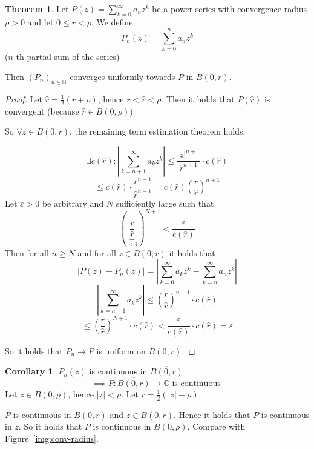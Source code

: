 \documentclass[a4paper,landscape,twocolumn]{article}
\theoremstyle{definition}
\newtheorem{theorem}{Theorem}
\newtheorem{cor}{Corollary}
\newcommand\abs[1]{\left|#1\right|}
\begin{document}
\begin{theorem}
  Let $P(z) = \sum_{k=0}^\infty a_n z^k$ be a power series with convergence radius
  $\rho > 0$ and let $0 \leq r < \rho$. We define
  \[ P_n(z) = \sum_{k=0}^n a_n z^k \]
  ($n$-th partial sum of the series)

  Then $(P_n)_{n\in\mathbb N}$ converges uniformly towards $P$ in $B(0,r)$.
\end{theorem}
\begin{proof}
  Let $\hat{r} = \frac12 (r + \rho)$, hence $r < \hat{r} < \rho$.
  Then it holds that $P(\hat{r})$ is convergent (because $\hat{r} \in B(0,\rho)$)

  So $\forall z \in B(0, r)$, the remaining term estimation theorem holds.

  \[
    \exists c(\hat{r}):
    \abs{\sum_{k=n+1}^\infty a_k z^k} \leq \frac{\abs{z}^{n+1}}{\hat{r}^{n+1}} \cdot c(\hat{r})
  \] \[
    \leq c(\hat{r}) \cdot \frac{r^{n+1}}{\hat{r}^{n+1}} = c(\hat{r}) \left(\frac{r}{\hat{r}}\right)^{n+1}
  \]
  Let $\varepsilon > 0$ be arbitrary and $N$ sufficiently large such that
  \[ \left(\underbrace{\frac{r}{\hat r}}_{<1}\right)^{N+1} < \frac{\varepsilon}{c(\hat r)} \]
  Then for all $n \geq N$ and for all $z \in B(0, r)$ it holds that
  \[ \abs{P(z) - P_n(z)} = \abs{\sum_{k=0}^\infty a_k z^k - \sum_{k=n}^\infty a_n z^k} \]
  \[ \abs{\sum_{k=n+1}^\infty a_k z^k} \leq \left(\frac{r}{\hat r}\right)^{n+1} \cdot c(\hat r) \]
  \[ \leq \left(\frac r{\hat{r}}\right)^{N+1} \cdot c(\hat r) < \frac{\varepsilon}{c(\hat r)} \cdot c(\hat r) = \varepsilon \]

  So it holds that $P_n \to P$ is uniform on $B(0, r)$.
\end{proof}

\begin{cor}
  $P_n(z)$ is continuous in $\overline{B(0, r)}$
  \[ \implies P: \overline{B(0, r)} \to \mathbb C \text{ is continuous }  \]
  Let $z \in B(0, \rho)$, hence $\abs{z} < \rho$. Let $r = \frac12 (\abs{z} + \rho)$.

  $P$ is continuous in $\overline{B(0,r)}$ and $z \in B(0,r)$. Hence it holds that
  $P$ is continuous in $z$. So it holds that $P$ is continuous in $B(0, \rho)$.
  Compare with Figure~\ref{img:conv-radius}.
\end{cor}
\end{document}
